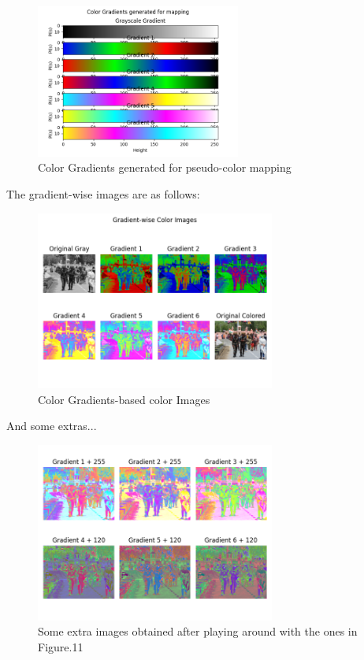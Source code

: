 \documentclass[notitlepage]{report}
\begin{document}
\begin{figure}[htp]
    \centering
    \hypertarget{Grads}{\includegraphics[width = 0.6\textwidth]{Grads.png}}
    \caption{Color Gradients generated for pseudo-color mapping}
    \label{fig10:sysfig}
\end{figure}

The gradient-wise images are as follows:

\begin{figure}[htp]
    \centering
    \hypertarget{G2C}{\includegraphics[width = 0.7\textwidth]{G2C.png}}
    \caption{Color Gradients-based color Images}
    \label{fig11:sysfig}
\end{figure}

And some extras...
\begin{figure}[htp]
    \centering
    \hypertarget{Grads}{\includegraphics[width = 0.7\textwidth]{G2C_extras.png}}
    \caption{Some extra images obtained after playing around with the ones in Figure.11}
    \label{fig12:sysfig}
\end{figure}
\end{document}
